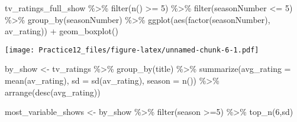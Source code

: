 \documentclass[
]{article}
\newenvironment{Shaded}{\begin{snugshade}}{\end{snugshade}}
\newcommand{\AttributeTok}[1]{\textcolor[rgb]{0.77,0.63,0.00}{#1}}
\newcommand{\DecValTok}[1]{\textcolor[rgb]{0.00,0.00,0.81}{#1}}
\newcommand{\FunctionTok}[1]{\textcolor[rgb]{0.00,0.00,0.00}{#1}}
\newcommand{\NormalTok}[1]{#1}
\newcommand{\OtherTok}[1]{\textcolor[rgb]{0.56,0.35,0.01}{#1}}
\newcommand{\SpecialCharTok}[1]{\textcolor[rgb]{0.00,0.00,0.00}{#1}}
\begin{document}
\begin{Shaded}
\begin{Highlighting}[]
\NormalTok{tv\_ratings\_full\_show }\SpecialCharTok{\%\textgreater{}\%}
  \FunctionTok{filter}\NormalTok{(}\FunctionTok{n}\NormalTok{() }\SpecialCharTok{\textgreater{}=} \DecValTok{5}\NormalTok{) }\SpecialCharTok{\%\textgreater{}\%}
  \FunctionTok{filter}\NormalTok{(seasonNumber }\SpecialCharTok{\textless{}=} \DecValTok{5}\NormalTok{) }\SpecialCharTok{\%\textgreater{}\%}
  \FunctionTok{group\_by}\NormalTok{(seasonNumber) }\SpecialCharTok{\%\textgreater{}\%}
  \FunctionTok{ggplot}\NormalTok{(}\FunctionTok{aes}\NormalTok{(}\FunctionTok{factor}\NormalTok{(seasonNumber), av\_rating)) }\SpecialCharTok{+}
  \FunctionTok{geom\_boxplot}\NormalTok{()}
\end{Highlighting}
\end{Shaded}

\texttt{[image: Practice12\_files/figure-latex/unnamed-chunk-6-1.pdf]}

\begin{Shaded}
\begin{Highlighting}[]
\NormalTok{by\_show }\OtherTok{\textless{}{-}}\NormalTok{ tv\_ratings }\SpecialCharTok{\%\textgreater{}\%}
  \FunctionTok{group\_by}\NormalTok{(title) }\SpecialCharTok{\%\textgreater{}\%}
  \FunctionTok{summarize}\NormalTok{(}\AttributeTok{avg\_rating =} \FunctionTok{mean}\NormalTok{(av\_rating),}
            \AttributeTok{sd =} \FunctionTok{sd}\NormalTok{(av\_rating),}
            \AttributeTok{season =} \FunctionTok{n}\NormalTok{()) }\SpecialCharTok{\%\textgreater{}\%}
  \FunctionTok{arrange}\NormalTok{(}\FunctionTok{desc}\NormalTok{(avg\_rating))}

\NormalTok{most\_variable\_shows }\OtherTok{\textless{}{-}}\NormalTok{ by\_show }\SpecialCharTok{\%\textgreater{}\%}
  \FunctionTok{filter}\NormalTok{(season }\SpecialCharTok{\textgreater{}=}\DecValTok{5}\NormalTok{) }\SpecialCharTok{\%\textgreater{}\%}
  \FunctionTok{top\_n}\NormalTok{(}\DecValTok{6}\NormalTok{,sd)}
\end{Highlighting}
\end{Shaded}
\end{document}

